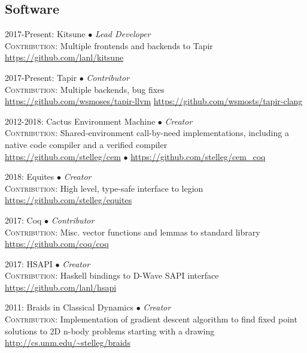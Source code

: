 \newcommand{\entry}[3]{\begin{samepage}{#1: #2 \\ #3}\end{samepage}}
\subsection{Software}
\entry{2017-Present}{Kitsune $\bullet$ \textit{\small{Lead Developer}}}
{\textsc{Contribution:} Multiple frontends and backends to Tapir\\ 
\url{https://github.com/lanl/kitsune}}
\entry{2017-Present}{Tapir $\bullet$ \textit{\small{Contributor}}}
{\textsc{Contribution:} Multiple backends, bug fixes \\ 
\url{https://github.com/wsmoses/tapir-llvm}
\url{https://github.com/wsmosts/tapir-clang}}
\entry{2012-2018}{Cactus Environment Machine $\bullet$
\textit{\small{Creator}}}
{\textsc{Contribution:} Shared-environment call-by-need implementations, including a native code
compiler and a verified compiler \\ 
\url{https://github.com/stelleg/cem} $\bullet$
\url{https://github.com/stelleg/cem\_coq}}
\entry{2018}{Equites $\bullet$ \textit{\small{Creator}}}
{\textsc{Contribution:} High level, type-safe interface to legion \\ 
\url{https://github.com/stelleg/equites}}
\entry{2017}{Coq $\bullet$ \textit{\small{Contributor}}} 
{\textsc{Contribution:} Misc. vector functions and lemmas to standard library\\ 
\url{https://github.com/coq/coq}}
\entry{2017}{HSAPI $\bullet$ \textit{\small{Creator}}}
{\textsc{Contribution:} Haskell bindings to D-Wave SAPI interface \\
\url{https://github.com/lanl/hsapi}}
\entry{2011}{Braids in Classical Dynamics $\bullet$ \textit{\small{Creator}}}
{\textsc{Contribution:} Implementation of gradient descent algorithm to find
fixed point solutions to 2D n-body problems starting with a drawing \\
\url{http://cs.unm.edu/~stelleg/braids}}
